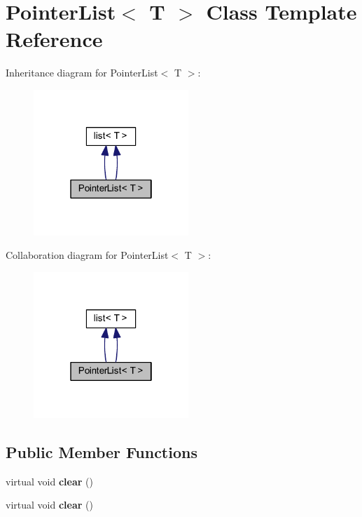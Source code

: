 \hypertarget{class_pointer_list}{
\section{PointerList$<$ T $>$ Class Template Reference}
\label{class_pointer_list}
}


Inheritance diagram for PointerList$<$ T $>$:\nopagebreak
\begin{figure}[H]
\begin{center}
\leavevmode
\includegraphics[width=166pt]{class_pointer_list__inherit__graph}
\end{center}
\end{figure}


Collaboration diagram for PointerList$<$ T $>$:\nopagebreak
\begin{figure}[H]
\begin{center}
\leavevmode
\includegraphics[width=166pt]{class_pointer_list__coll__graph}
\end{center}
\end{figure}
\subsection*{Public Member Functions}
\begin{DoxyCompactItemize}
\item 
\hypertarget{class_pointer_list_aa9dceb63dc29c81d055cae67c1529d7b}{
virtual void {\bfseries clear} ()}
\label{class_pointer_list_aa9dceb63dc29c81d055cae67c1529d7b}

\item 
\hypertarget{class_pointer_list_aa9dceb63dc29c81d055cae67c1529d7b}{
virtual void {\bfseries clear} ()}
\label{class_pointer_list_aa9dceb63dc29c81d055cae67c1529d7b}

\end{DoxyCompactItemize}
